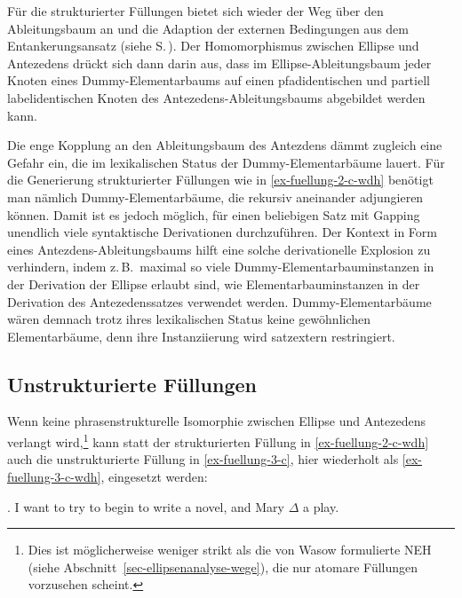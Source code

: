 \begin{sloppypar} Für die  strukturierter Füllungen bietet sich wieder der Weg über den Ableitungsbaum an und die Adaption der externen Bedingungen aus dem Entankerungsansatz (siehe S.\,\pageref{sec-deanchoring-extern}). Der Homomorphismus zwischen Ellipse und Antezedens drückt sich dann darin aus, dass im Ellipse-Ableitungsbaum jeder Knoten eines Dummy-Elementarbaums auf einen pfadidentischen und partiell labelidentischen Knoten des Antezedens-Ableitungsbaums abgebildet werden kann.\end{sloppypar}   

\newpage
Die enge Kopplung an den Ableitungsbaum des Antezdens dämmt zugleich eine Gefahr ein, die im lexikalischen Status der Dummy-Elementarbäume lauert. Für die Generierung strukturierter Füllungen wie in \ref{ex-fuellung-2-c-wdh} benötigt man nämlich Dummy-Elementarbäume, die rekursiv aneinander adjungieren können. Damit ist es jedoch möglich, für einen beliebigen Satz mit Gapping unendlich viele syntaktische Derivationen durchzuführen. Der Kontext in Form eines Antezdens-Ableitungsbaums hilft eine solche derivationelle Explosion zu verhindern, indem z.\,B.\ maximal so viele Dummy-Elementarbauminstanzen in der Derivation der Ellipse erlaubt sind, wie Elementarbauminstanzen in der Derivation des Antezedenssatzes verwendet werden. Dummy-Elementarbäume wären demnach trotz ihres lexikalischen Status keine gewöhnlichen Elementarbäume, denn ihre Instanziierung wird satzextern restringiert.

\subsection{Unstrukturierte Füllungen}

Wenn keine phrasenstrukturelle Isomorphie zwischen Ellipse und Antezedens verlangt wird,\footnote{Dies ist möglicherweise weniger strikt als die von Wasow formulierte NEH (siehe Abschnitt~\ref{sec-ellipsenanalyse-wege}), die nur atomare Füllungen vorzusehen scheint.} kann statt der strukturierten Füllung in \ref{ex-fuellung-2-c-wdh} auch die unstrukturierte Füllung in \ref{ex-fuellung-3-c}, hier wiederholt als \ref{ex-fuellung-3-c-wdh}, eingesetzt werden:
  
\ex. I want to try to begin to write a novel, and Mary $\Delta$ a play.\label{ex-fuellung-3-c-wdh}
  
